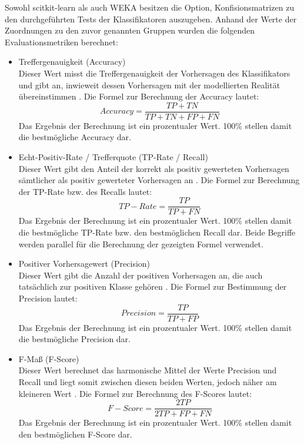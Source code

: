 Sowohl scitkit-learn als auch WEKA besitzen die Option, Konfisionsmatrizen zu den durchgeführten Tests der Klassifikatoren auszugeben. Anhand der Werte der Zuordnungen zu den zuvor genannten Gruppen wurden die folgenden Evaluationsmetriken berechnet: 

\begin{itemize}
\item Treffergenauigkeit (Accuracy)
\\Dieser Wert misst die Treffergenauigkeit der Vorhersagen des Klassifikators und gibt an, inwieweit dessen Vorhersagen mit der modellierten Realität übereinstimmen \cite{Sammut2017}. Die Formel zur Berechnung der Accuracy lautet:
\\\[Accuracy = \frac{TP+TN}{TP+TN+FP+FN}\]
Das Ergebnis der Berechnung ist ein prozentualer Wert. 100\% stellen damit die bestmögliche Accuracy dar.
\item Echt-Positiv-Rate / Trefferquote (TP-Rate / Recall)
\\Dieser Wert gibt den Anteil der korrekt als positiv gewerteten Vorhersagen sämtlicher als positiv gewerteter Vorhersagen an \cite{Alpaydin2010}. Die Formel zur Berechnung der TP-Rate bzw. des Recalls lautet:
\\\[TP-Rate = \frac{TP}{TP+FN}\]
Das Ergebnis der Berechnung ist ein prozentualer Wert. 100\% stellen damit die bestmögliche TP-Rate bzw. den bestmöglichen Recall dar. Beide Begriffe werden parallel für die Berechnung der gezeigten Formel verwendet.
\item Positiver Vorhersagewert (Precision)
\\ Dieser Wert gibt die Anzahl der positiven Vorhersagen an, die auch tatsächlich zur positiven Klasse gehören \cite{Sammut2017}. Die Formel zur Bestimmung der Precision lautet:
\\\[Precision = \frac{TP}{TP+FP}\]
Das Ergebnis der Berechnung ist ein prozentualer Wert. 100\% stellen damit die bestmögliche Precision dar.
\item F-Maß (F-Score)
\\ Dieser Wert berechnet das harmonische Mittel der Werte Precision und Recall und liegt somit zwischen diesen beiden Werten, jedoch näher am kleineren Wert \cite{Sammut2017}. Die Formel zur Berechnung des F-Scores lautet:
\\\[F-Score = \frac{2TP}{2TP+FP+FN}\]
Das Ergebnis der Berechnung ist ein prozentualer Wert. 100\% stellen damit den bestmöglichen F-Score dar.
\end{itemize}

